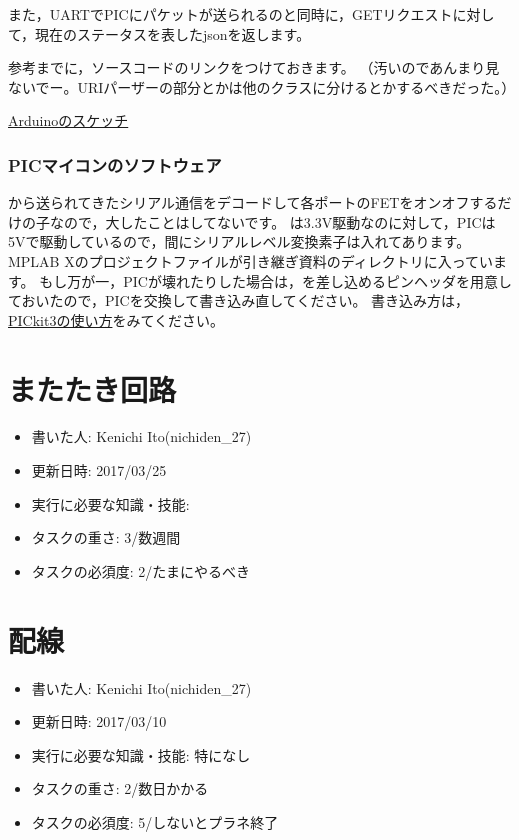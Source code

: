 \documentclass[letterpaper,10pt,dvipdfmx]{sphinxmanual}
\begin{document}
また，UARTでPICにパケットが送られるのと同時に，GETリクエストに対して，現在のステータスを表したjsonを返します。

参考までに，ソースコードのリンクをつけておきます。
（汚いのであんまり見ないでー。URIパーザーの部分とかは他のクラスに分けるとかするべきだった。）

\href{https://github.com/macv35/nichiden27/blob/master/PISCIUM/PISCIUMServer/PISCIUMServer.ino}{Arduinoのスケッチ}


\subsection{PICマイコンのソフトウェア}
\label{\detokenize{wireless/piscium:pic}}
から送られてきたシリアル通信をデコードして各ポートのFETをオンオフするだけの子なので，大したことはしてないです。
は3.3V駆動なのに対して，PICは5Vで駆動しているので，間にシリアルレベル変換素子は入れてあります。
MPLAB
Xのプロジェクトファイルが引き継ぎ資料のディレクトリに入っています。
もし万が一，PICが壊れたりした場合は，を差し込めるピンヘッダを用意しておいたので，PICを交換して書き込み直してください。
書き込み方は，\href{http://ww1.microchip.com/downloads/jp/DeviceDoc/52010A\_JP.pdf}{PICkit3の使い方}をみてください。


\chapter{またたき回路}
\label{\detokenize{twinkle::doc}}\label{\detokenize{twinkle:id1}}\begin{itemize}
\item {} 
書いた人: Kenichi Ito(nichiden\_27)

\item {} 
更新日時: 2017/03/25

\item {} 
実行に必要な知識・技能:

\item {} 
タスクの重さ: 3/数週間

\item {} 
タスクの必須度: 2/たまにやるべき

\end{itemize}


\chapter{配線}
\label{\detokenize{haisen::doc}}\label{\detokenize{haisen:id1}}\begin{itemize}
\item {} 
書いた人: Kenichi Ito(nichiden\_27)

\item {} 
更新日時: 2017/03/10

\item {} 
実行に必要な知識・技能: 特になし

\item {} 
タスクの重さ: 2/数日かかる

\item {} 
タスクの必須度: 5/しないとプラネ終了

\end{itemize}
\end{document}
